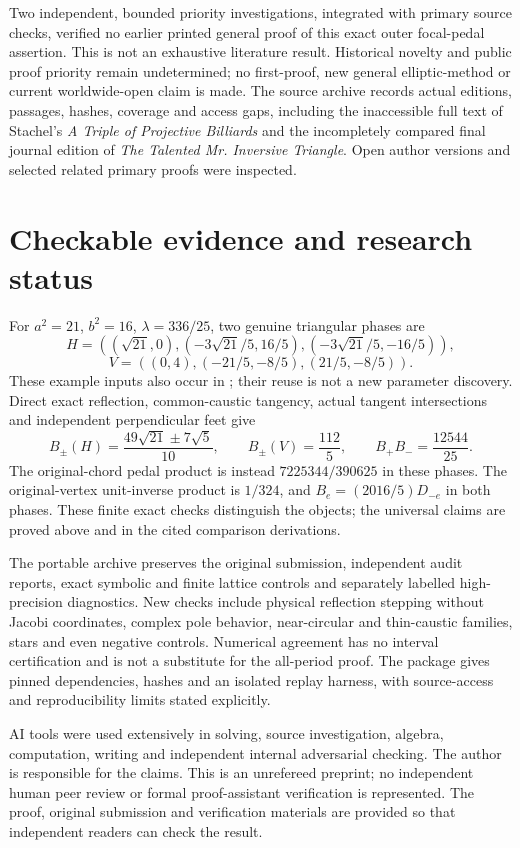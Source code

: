\documentclass[11pt]{article}
\begin{document}
Two independent, bounded priority investigations, integrated with primary
source checks, verified no earlier printed general proof of this exact
outer focal-pedal assertion. This is not an exhaustive literature result.
Historical novelty and public proof priority remain undetermined; no
first-proof, new general elliptic-method or current worldwide-open claim
is made. The source archive records actual editions, passages, hashes,
coverage and access gaps, including the inaccessible full text of
Stachel's \emph{A Triple of Projective Billiards} and the incompletely
compared final journal edition of \emph{The Talented Mr. Inversive Triangle}.
Open author versions and selected related primary proofs were inspected.

\section{Checkable evidence and research status}
For $a^2=21$, $b^2=16$, $\lambda=336/25$, two genuine triangular phases are
\[
 H=((\sqrt{21},0),(-3\sqrt{21}/5,16/5),(-3\sqrt{21}/5,-16/5)),
\]
\[
 V=((0,4),(-21/5,-8/5),(21/5,-8/5)).
\]
These example inputs also occur in \cite[Section 6]{F62}; their reuse is
not a new parameter discovery. Direct exact reflection, common-caustic
tangency, actual tangent intersections and independent perpendicular feet
give
\[
 B_\pm(H)=\frac{49\sqrt{21}\pm7\sqrt5}{10},\qquad
 B_\pm(V)=\frac{112}{5},\qquad B_+B_-=\frac{12544}{25}.
\]
The original-chord pedal product is instead $7225344/390625$ in these
phases. The original-vertex unit-inverse product is $1/324$, and
$B_e=(2016/5)D_{-e}$ in both phases. These finite exact checks distinguish
the objects; the universal claims are proved above and in the cited
comparison derivations.

The portable archive preserves the original submission, independent
audit reports, exact symbolic and finite lattice controls and separately
labelled high-precision diagnostics. New checks include physical
reflection stepping without Jacobi coordinates, complex pole behavior,
near-circular and thin-caustic families, stars and even negative controls.
Numerical agreement has no interval certification and is not a substitute
for the all-period proof. The package gives pinned dependencies, hashes
and an isolated replay harness, with source-access and reproducibility
limits stated explicitly.

AI tools were used extensively in solving, source investigation, algebra,
computation, writing and independent internal adversarial checking.
The author is responsible for the claims. This is an unrefereed preprint;
no independent human peer review or formal proof-assistant verification
is represented. The proof, original submission and verification materials
are provided so that independent readers can check the result.
\end{document}
